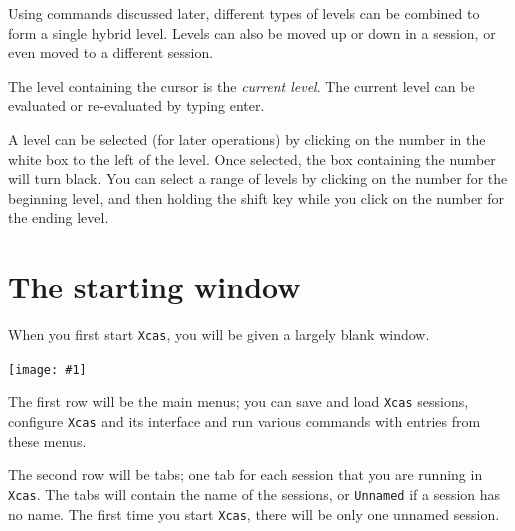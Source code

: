 \documentclass[a4paper,11pt]{book}
\newcommand{\includeimage}[1]
{\texttt{[image: \#1]}}
\begin{document}
Using commands discussed later, different types of levels can be
combined to form a single hybrid level.  Levels can also be moved up
or down in a session, or even moved to a different session.

The level containing the cursor is the \emph{current level}.  The
current level can be evaluated or re-evaluated by typing enter.

A level can be selected (for later operations) by clicking on the
number in the white box to the left of the level.  Once selected, the
box containing the number will turn black.  You can select a range of
levels by clicking on the number for the beginning level, and then
holding the shift key while you click on the number for the ending level.

\section{The starting window}

When you first start \texttt{Xcas}, you will be given a largely blank window.
\begin{center}
  \includeimage{xcas-open.png}
\end{center}
The first row will be the main menus; you can 
save and load \texttt{Xcas} sessions, configure \texttt{Xcas} and its
interface and run various commands with entries from these menus.

The second row will be tabs; one tab for each session that you are
running in \texttt{Xcas}.  The tabs will contain the name of the
sessions, or \texttt{Unnamed} if a session has no name.  The first
time you start \texttt{Xcas}, there will be only one unnamed session.
\end{document}
